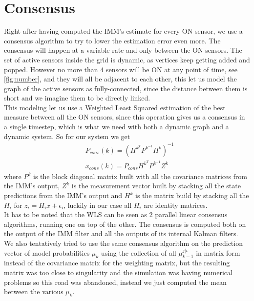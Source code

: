 \documentclass[twocolumn]{article}
\begin{document}
\section*{Consensus}
Right after having computed the IMM's estimate for every ON sensor, we use a consensus algorithm to try to lower the
estimation error even more. The consensus will happen at a variable rate and only between the ON sensors.
The set of active sensors inside the grid is dynamic, as vertices keep getting added and popped. However no
more than 4 sensors will be ON at any point of time, see \ref{fig:number}, and they will all be adjacent to each other,
this let us model the graph of the active sensors as fully-connected, since the distance between them is short
and we imagine them to be directly linked.
\\
This modeling let us use a Weighted Least Squared estimation of the best measure between all the ON sensors, since this operation
gives us a consensus in a single timestep, which is what we need with both a dynamic graph and a dynamic system.
So for our system we get
\begin{align*}
     & P_{cons}(k)=(H^{k^{T}}P^{k^{-1}}H^{k})^{-1}  \\
     & x_{cons}(k)=P_{cons}H^{k^{T}}P^{k^{-1}}Z^{k}
\end{align*}
where $P^{k}$ is the block diagonal matrix built with all the covariance matrices from the IMM's output, $Z^{k}$
is the measurement vector built by stacking all the state predictions from the IMM's output and $H^{k}$ is the matrix build by
stacking all the $H_{i}$ for $z_{i}=H_{i}x+\epsilon_{i}$, luckily in our case all $H_{i}$ are identity matrices.\\
It has to be noted that the WLS can be seen as 2 parallel linear consensus algorithms, running one on top of the other.
The consensus is computed both on the output of the IMM filter and all the outputs of its internal Kalman filters.
\\
We also tentatively tried to use the same consensus algorithm on the prediction vector of model probabilities $\mu_{k}$ using
the collection of all $\mu^{j|i}_{k-1}$ in matrix form instead of the covariance matrix for the weighting matrix, but
the resulting matrix was too close to singularity and the simulation was having numerical problems so this road
was abandoned, instead we just computed the mean between the various $\mu_{k}$.
\newpage
\end{document}
